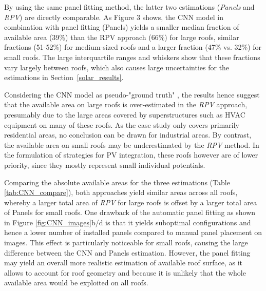 By using the same panel fitting method, the latter two estimations (\textit{Panels} and \textit{RPV}) are directly comparable. As Figure 3 shows, the CNN model in combination with panel fitting (Panels)  yields a smaller median fraction of available area (39\%) than the RPV approach (66\%) for large roofs, similar fractions (51-52\%) for medium-sized roofs and a larger fraction (47\% vs. 32\%) for small roofs. The large interquartile ranges and whiskers show that these fractions vary largely between roofs, which also causes large uncertainties for the estimations in Section~\ref{solar_results}. 

Considering the CNN model as pseudo-"ground truth"
, the results hence suggest that the available area on large roofs is over-estimated in the \textit{RPV} approach, presumably due to the large areas covered by superstructures such as HVAC equipment on many of these roofs. As the case study only covers primarily residential areas, no conclusion can be drawn for industrial areas. 
By contrast, the available area on small roofs may be underestimated by the \textit{RPV} method. In the formulation of strategies for PV integration, these roofs however are of lower priority, since they mostly 
represent small individual potentials.

Comparing the absolute available areas for the three estimations (Table \ref{tab:CNN_compare}), both approaches yield similar areas across all roofs, whereby a larger total area of \textit{RPV} for large roofs is offset by a larger total area of Panels for small roofs. One drawback of the automatic panel fitting as shown in Figure \ref{fig:CNN_images}b/d is that it yields suboptimal configurations and hence a lower number of installed panels compared to manual panel placement on images. This effect is particularly noticeable for small roofs, causing the large difference between the CNN and Panels estimation. However, the panel fitting may yield an overall more realistic estimation of available roof surface, as it allows to account for roof geometry and because it is unlikely that the whole available area would be exploited on all roofs. 

